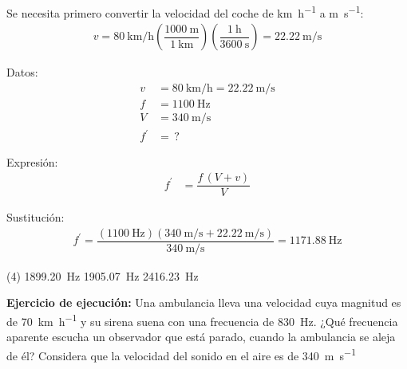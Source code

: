 \documentclass[12pt, letter]{exam}
\begin{document}
\begin{questions}
    Se necesita primero convertir la velocidad del coche de \unit{\kilo\meter\per\hour} a \unit{\meter\per\second}:
    \begin{align*}
    v = \SI[per-mode=fraction]{80}{\kilo\meter\per\hour} \left( \dfrac{\SI{1000}{\meter}}{\SI{1}{\kilo\meter}} \right) \left( \dfrac{\SI{1}{\hour}}{\SI{3600}{\second}} \right) = \SI[per-mode=fraction]{22.22}{\meter\per\second}
    \end{align*}
    
    \begin{minipage}[t]{0.35\linewidth}
    Datos: 
    \begin{align*}
    v &= \SI{80}{\kilo\meter\per\hour} = \SI{22.22}{\meter\per\second} \\
    f &= \SI{1100}{\hertz} \\
    V &= \SI{340}{\meter\per\second} \\
    f^{\prime} &= \, ?
    \end{align*}
    \end{minipage}
    \hspace{1cm}
    \begin{minipage}[t]{0.4\linewidth}
    Expresión:
    \begin{align*}
    f^{\prime} &= \dfrac{f \, (V + v)}{V}
    \end{align*}
    \end{minipage}

    Sustitución:
    \begin{align*}
    f^{\prime} = \dfrac{\left( \SI{1100}{\hertz} \right)\left( \displaystyle \SI[per-mode=fraction]{340}{\meter\per\second} + \SI[per-mode=fraction]{22.22}{\meter\per\second} \right)}{\displaystyle \SI[per-mode=fraction]{340}{\meter\per\second}} = \SI{1171.88}{\hertz}
    \end{align*}

    \begin{tasks}(4)
        \task {}
        \task \SI{1899.20}{\hertz}
        \task \SI{1905.07}{\hertz}
        \task \SI{2416.23}{\hertz}
    \end{tasks}

    \setcounter{question}{11} \question \textbf{Ejercicio de ejecución: } Una ambulancia lleva una velocidad cuya magnitud es de \SI{70}{\kilo\meter\per\hour} y su sirena suena con una frecuencia de \SI{830}{\hertz}. ¿Qué frecuencia aparente escucha un observador que está parado, cuando la ambulancia se aleja de él? Considera que la velocidad del sonido en el aire es de \SI{340}{\meter\per\second}


\end{questions}
\end{document}
